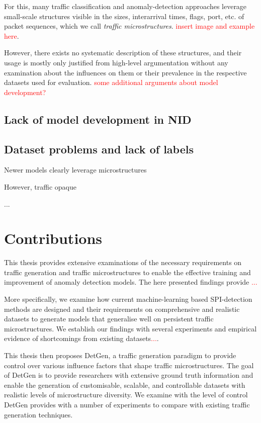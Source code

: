 For this, many traffic classification and anomaly-detection approaches leverage small-scale structures visible in the sizes, interarrival times, flags, port, etc. of packet sequences, which we call \emph{traffic microstructures}. \textcolor{red}{insert image and example here}. 

However, there exists no systematic description of these structures, and their usage is mostly only justified from high-level argumentation without any examination about the influences on them or their prevalence in the respective datasets used for evaluation. \textcolor{red}{some additional arguments about model development?}


\subsection{Lack of model development in NID}


\subsection{Dataset problems and lack of labels}




Newer models clearly leverage microstructures

However, traffic opaque 

...

\section{Contributions}

This thesis provides extensive examinations of the necessary requirements on traffic generation and traffic microstructures to enable the effective training and improvement of anomaly detection models. The here presented findings provide \textcolor{red}{...}

More specifically, we examine how current machine-learning based SPI-detection methods are designed and their requirements on comprehensive and realistic datasets to generate models that generalise well on persistent traffic microstructures. We establish our findings with several experiments and empirical evidence of shortcomings from existing datasets\textcolor{red}{...}.

This thesis then proposes DetGen, a traffic generation paradigm to provide control over various influence factors that shape traffic microstructures. The goal of DetGen is to provide researchers with extensive ground truth information and enable the generation of customisable, scalable, and controllable datasets with realistic levels of microstructure diversity. We examine with the level of control DetGen provides with a number of experiments to compare with existing traffic generation techniques. 

